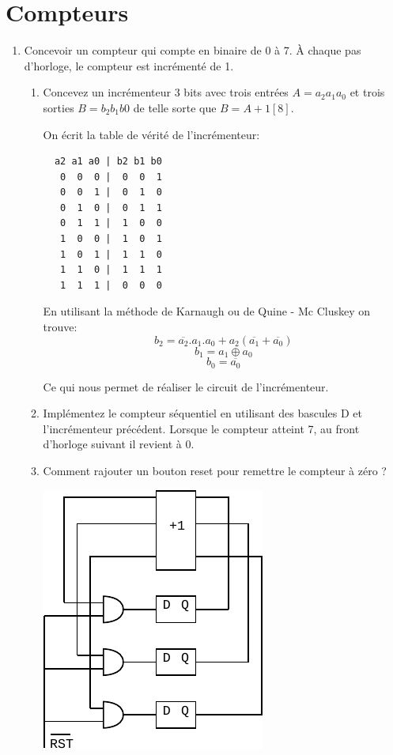 \documentclass[a4paper,10pt]{exam}
\begin{document}
\section{Compteurs}
\begin{enumerate}
\item Concevoir un compteur qui compte en binaire de 0 à 7. À chaque pas
  d'horloge, le compteur est incrémenté de 1.
  \begin{enumerate}
  \item Concevez un incrémenteur 3 bits avec trois entrées $A=a_2a_1a_0$ et
    trois sorties $B=b_2b_1b0$ de telle sorte que $B = A + 1 [8]$.

\begin{solution}
  On écrit la table de vérité de l'incrémenteur:
\begin{verbatim}
  a2 a1 a0 | b2 b1 b0
   0  0  0 |  0  0  1
   0  0  1 |  0  1  0
   0  1  0 |  0  1  1
   0  1  1 |  1  0  0
   1  0  0 |  1  0  1
   1  0  1 |  1  1  0
   1  1  0 |  1  1  1
   1  1  1 |  0  0  0
\end{verbatim}
En utilisant la méthode de Karnaugh ou de Quine - Mc Cluskey on trouve:
$$ b_2 = \overline{a_2}.a_1.a_0 + a_2(\overline{a_1} + \overline{a_0}) $$
$$ b_1 = a_1 \oplus a_0 $$
$$ b_0 = \overline{a_0} $$

Ce qui nous permet de réaliser le circuit de l'incrémenteur.
\end{solution}

  \item Implémentez le compteur séquentiel en utilisant des bascules D et
    l'incrémenteur précédent. Lorsque le compteur atteint 7, au front d'horloge
    suivant il revient à 0.

  \item Comment rajouter un bouton reset pour remettre le compteur à zéro ?

\begin{solution}
  \includegraphics{TD8-inc}
\end{solution}


\end{enumerate}
\end{enumerate}
\end{document}
